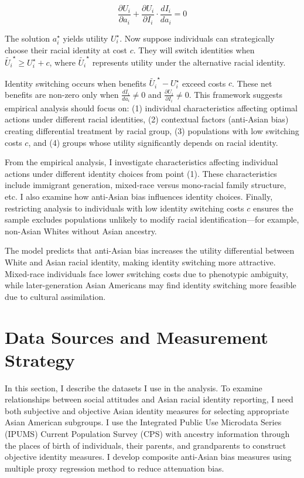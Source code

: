 \begin{equation}
\frac{\partial U_i}{\partial a_i} + \frac{\partial U_i}{\partial I_i} \cdot \frac{d I_i}{d a_i} = 0\label{eq:foc}
\end{equation}

The solution $a_{i}^{\star}$ yields utility $U_{i}^{\star}$. Now suppose individuals can strategically choose their racial identity at cost $c$. They will switch identities when $\tilde{U_{i}}^{\star} \geq U_{i}^{\star} + c$, where $\tilde{U_{i}}^{\star}$ represents utility under the alternative racial identity.

Identity switching occurs when benefits $\tilde{U_{i}}^{\star} - U_{i}^{\star}$ exceed costs $c$. These net benefits are non-zero only when $\frac{d I_i}{d a_i} \neq 0$ and $\frac{\partial U_i}{\partial I_i} \neq 0$. This framework suggests empirical analysis should focus on: (1) individual characteristics affecting optimal actions under different racial identities, (2) contextual factors (anti-Asian bias) creating differential treatment by racial group, (3) populations with low switching costs $c$, and (4) groups whose utility significantly depends on racial identity.

From the empirical analysis, I investigate characteristics affecting individual actions under different identity choices from point (1). These characteristics include immigrant generation, mixed-race versus mono-racial family structure, etc. I also examine how anti-Asian bias influences identity choices. Finally, restricting analysis to individuals with low identity switching costs $c$ ensures the sample excludes populations unlikely to modify racial identification—for example, non-Asian Whites without Asian ancestry.

The model predicts that anti-Asian bias increases the utility differential between White and Asian racial identity, making identity switching more attractive. Mixed-race individuals face lower switching costs due to phenotypic ambiguity, while later-generation Asian Americans may find identity switching more feasible due to cultural assimilation.

\section{Data Sources and Measurement Strategy}\label{sec:data}

In this section, I describe the datasets I use in the analysis. To examine relationships between social attitudes and Asian racial identity reporting, I need both subjective and objective Asian identity measures for selecting appropriate Asian American subgroups. I use the Integrated Public Use Microdata Series (IPUMS) Current Population Survey (CPS) \autocite{floodsarahIntegratedPublicUse2021a} with ancestry information through the places of birth of individuals, their parents, and grandparents to construct objective identity measures. I develop composite anti-Asian bias measures using \textcite{lubotskyInterpretationRegressionsMultiple2006} multiple proxy regression method to reduce attenuation bias.

